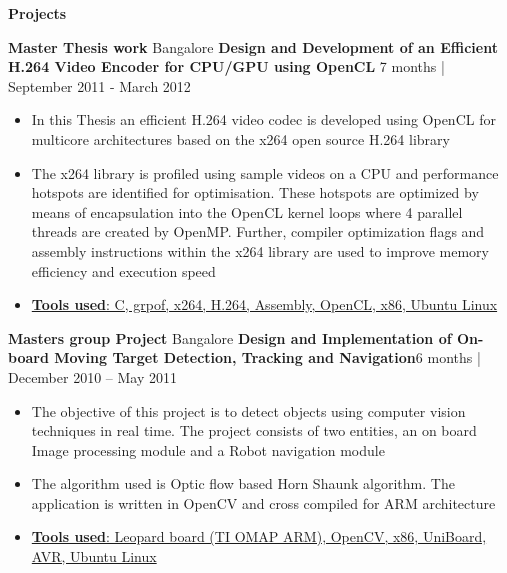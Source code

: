 \begin{center}
\textbf{Projects}
\end{center}

    \textbf{Master Thesis work} \hfill{Bangalore}%
\newline    
\textbf{Design and Development of an Efficient H.264 Video Encoder for CPU/GPU using OpenCL} \hfill{7 months | September 2011 - March 2012}
    
      \begin{itemize}
          
        \item {In this Thesis an efficient H.264 video codec is developed using OpenCL for multicore architectures based on the x264 open source H.264 library}
        \item {The x264 library is profiled using sample videos on a CPU and performance hotspots are identified for optimisation. These hotspots are optimized by means of encapsulation into the OpenCL kernel loops where 4 parallel threads are created by OpenMP. Further, compiler optimization flags and assembly instructions within the x264 library are used to improve memory efficiency and execution speed}
        \item {\underline {\textbf{Tools used}: C, grpof, x264, H.264, Assembly, OpenCL, x86, Ubuntu Linux}}
     \end{itemize}
    
    \textbf {Masters group Project} \hfill{Bangalore}
    \newline
   \textbf{Design and Implementation of On-board Moving Target Detection, Tracking and Navigation}\hfill {6 months | December 2010 – May 2011}

      \begin{itemize}
        \item {The objective of this project is to detect objects using computer vision techniques in real time. The project consists of two entities, an on board Image processing module and a Robot navigation module}
        \item {The algorithm used is Optic flow based Horn Shaunk algorithm. The application is written in OpenCV and cross compiled for ARM architecture}
        \item {\underline{\textbf{Tools used}: Leopard board (TI OMAP ARM), OpenCV, x86, UniBoard, AVR, Ubuntu Linux}}
     \end{itemize}